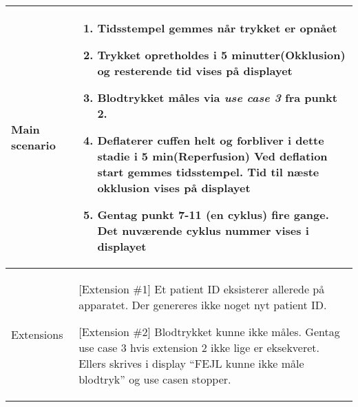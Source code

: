\begin{center}
\begin{longtable}{ | m{4cm} | m{8cm}| }
			\hline
			Main scenario & \begin{enumerate}
				\setlength\itemsep{0cm} %
				\setcounter{enumi}{7}				
				\item Tidsstempel gemmes når trykket er opnået
				\item Trykket opretholdes i 5 minutter(Okklusion) og resterende tid vises på displayet
				\item Blodtrykket måles via \textit{use case 3}
				fra punkt 2.
				\item Deflaterer cuffen helt og forbliver i dette stadie i 5 min(Reperfusion) Ved deflation start gemmes tidsstempel. Tid til næste okklusion vises på displayet
				\item Gentag punkt 7-11 (en cyklus) fire gange. Det nuværende cyklus nummer vises i displayet
			\end{enumerate} \\ 
			\hline
			Extensions & [Extension \#1] Et patient ID eksisterer allerede på apparatet. Der genereres ikke noget nyt patient ID.
			
			[Extension \#2] Blodtrykket kunne ikke måles. Gentag use case 3 hvis extension 2 ikke lige er eksekveret. Ellers skrives i display “FEJL kunne ikke måle blodtryk” og use casen stopper.  \\
			\hline
		\end{longtable}
		
	\end{center}
	\pagebreak